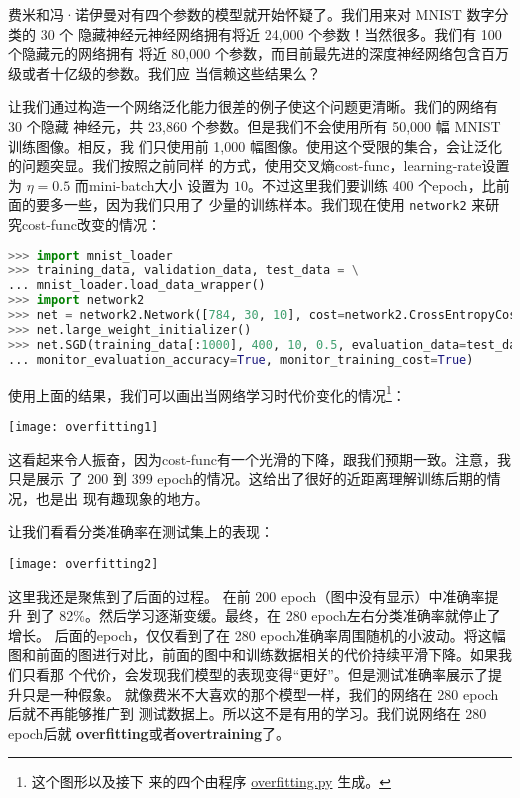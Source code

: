 费米和冯·诺伊曼对有四个参数的模型就开始怀疑了。我们用来对 MNIST 数字分类的 30 个
隐藏神经元神经网络拥有将近 24,000 个参数！当然很多。我们有 100 个隐藏元的网络拥有
将近 80,000 个参数，而目前最先进的深度神经网络包含百万级或者十亿级的参数。我们应
当信赖这些结果么？

让我们通过构造一个网络泛化能力很差的例子使这个问题更清晰。我们的网络有 30 个隐藏
神经元，共 23,860 个参数。但是我们不会使用所有 50,000 幅 MNIST 训练图像。相反，我
们只使用前 1,000 幅图像。使用这个受限的集合，会让泛化的问题突显。我们按照之前同样
的方式，使用交叉熵\gls*{cost-func}，\gls*{learning-rate}设置为 $\eta = 0.5$ 而\gls*{mini-batch}大小
设置为 $10$。不过这里我们要训练 400 个\gls*{epoch}，比前面的要多一些，因为我们只用了
少量的训练样本。我们现在使用 \lstinline!network2! 来研究\gls*{cost-func}改变的情况：

\begin{lstlisting}[language=Python]
>>> import mnist_loader
>>> training_data, validation_data, test_data = \
... mnist_loader.load_data_wrapper()
>>> import network2
>>> net = network2.Network([784, 30, 10], cost=network2.CrossEntropyCost)
>>> net.large_weight_initializer()
>>> net.SGD(training_data[:1000], 400, 10, 0.5, evaluation_data=test_data,
... monitor_evaluation_accuracy=True, monitor_training_cost=True)
\end{lstlisting}

使用上面的结果，我们可以画出当网络学习时代价变化的情况\footnote{这个图形以及接下
  来的四个由程序
  \href{https://github.com/mnielsen/neural-networks-and-deep-learning/blob/master/fig/overfitting.py}{overfitting.py}
  生成。}：
\begin{center}
  \texttt{[image: overfitting1]}
\end{center}
  
这看起来令人振奋，因为\gls*{cost-func}有一个光滑的下降，跟我们预期一致。注意，我只是展示
了 $200$ 到 $399$ \gls*{epoch}的情况。这给出了很好的近距离理解训练后期的情况，也是出
现有趣现象的地方。

让我们看看分类准确率在测试集上的表现：
\begin{center}
  \texttt{[image: overfitting2]}
\end{center}

这里我还是聚焦到了后面的过程。 在前 200 \gls*{epoch}（图中没有显示）中准确率提升
到了 82\%。然后学习逐渐变缓。最终，在 280 \gls*{epoch}左右分类准确率就停止了增长。
后面的\gls*{epoch}，仅仅看到了在 280 \gls*{epoch}准确率周围随机的小波动。将这幅
图和前面的图进行对比，前面的图中和训练数据相关的代价持续平滑下降。如果我们只看那
个代价，会发现我们模型的表现变得“更好”。但是测试准确率展示了提升只是一种假象。
就像费米不大喜欢的那个模型一样，我们的网络在 280 \gls*{epoch}后就不再能够推广到
测试数据上。所以这不是有用的学习。我们说网络在 280 \gls*{epoch}后就%
\textbf{\gls{overfitting}}或者\textbf{\gls{overtraining}}了。

